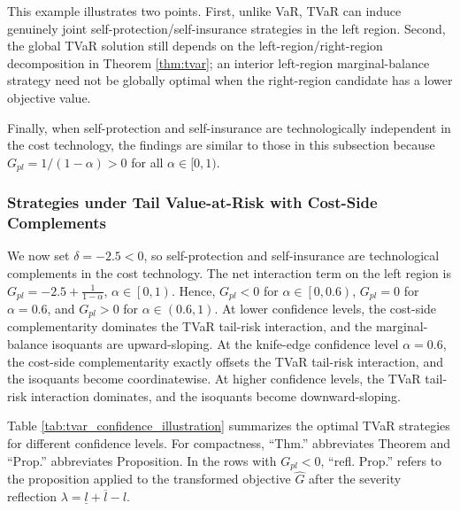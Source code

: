 \documentclass[a4paper,12pt]{article}
\begin{document}
This example illustrates two points. First, unlike VaR, TVaR can induce genuinely joint self-protection/self-insurance strategies in the left region. Second, the global TVaR solution still depends on the left-region/right-region decomposition in Theorem \ref{thm:tvar}; an interior left-region marginal-balance strategy need not be globally optimal when the right-region candidate has a lower objective value.

Finally, when self-protection and self-insurance are technologically independent in the cost technology, the findings are similar to those in this subsection because \(G_{pl}=1/(1-\alpha)>0\) for all \(\alpha\in[0,1)\).

\subsubsection{Strategies under Tail Value-at-Risk with Cost-Side Complements}

We now set $\delta=-2.5<0$, so self-protection and self-insurance are technological complements in the cost technology. The net interaction term on the left region is $G_{pl}=-2.5+\frac{1}{1-\alpha}$, $\alpha\in\left[0,1\right)$. Hence, $G_{pl}<0$ for $\alpha\in\left[0,0.6\right)$, $G_{pl}=0$ for $\alpha=0.6$, and $G_{pl}>0$ for $\alpha\in\left(0.6,1\right)$. At lower confidence levels, the cost-side complementarity dominates the TVaR tail-risk interaction, and the marginal-balance isoquants are upward-sloping. At the knife-edge confidence level $\alpha=0.6$, the cost-side complementarity exactly offsets the TVaR tail-risk interaction, and the isoquants become coordinatewise. At higher confidence levels, the TVaR tail-risk interaction dominates, and the isoquants become downward-sloping.

Table \ref{tab:tvar_confidence_illustration} summarizes the optimal TVaR strategies for different confidence levels. For compactness, ``Thm.'' abbreviates Theorem and ``Prop.'' abbreviates Proposition. In the rows with $G_{pl}<0$, ``refl. Prop.'' refers to the proposition applied to the transformed objective $\hat{G}$ after the severity reflection $\lambda=\underline{l}+\overline{l}-l$.
\end{document}
